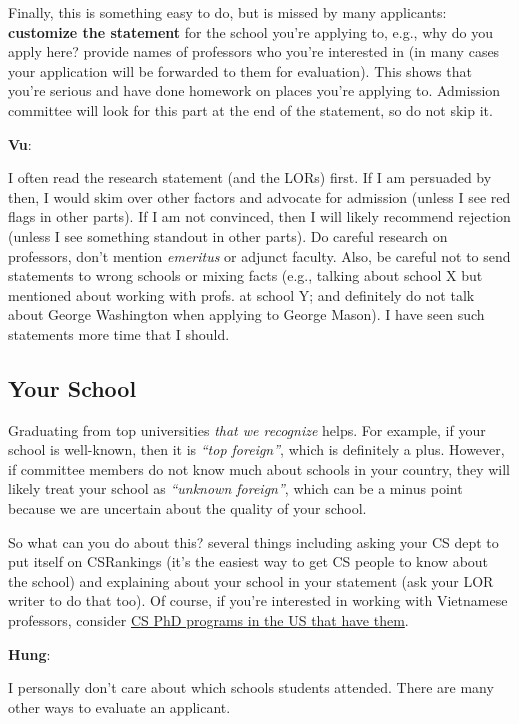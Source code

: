 \documentclass[11pt]{article}
\newenvironment{commentbox}[1][]{
\small
    \begin{cbox}
    \textbf{#1}: 
 }{
   \end{cbox}
}
\begin{document}
Finally, this is something easy to do, but is missed by many
applicants: \textbf{customize the statement} for the school you're applying to,
e.g., why do you apply here? provide names of professors who you're interested in (in many cases your application will be forwarded to them for evaluation).
This shows that you're serious and have done homework on places you're applying to.
Admission committee will look for this part at the end of the statement, so do not skip it.



\begin{commentbox}[Vu]
I often read the research statement (and the LORs) first. If I am
persuaded by then, I would skim over other factors and advocate for
admission (unless I see red flags in other parts). If I am not
convinced, then I will likely recommend rejection (unless I see
something standout in other parts).
\tcblower
Do careful research on professors, don't mention \emph{emeritus} or  adjunct faculty. 
Also, be careful not to send statements to wrong schools or mixing
facts (e.g., talking about school X but mentioned about working with
profs. at school Y; and definitely do not talk about George Washington when applying to George Mason). I have seen such statements more time that I
should.
\end{commentbox}


\subsection{Your School}\label{sec:your-school}

Graduating from top universities \emph{that we recognize} helps. For example, if your school is well-known, then it is \emph{``top foreign''}, which is definitely a plus.
However, if committee members do not know much about schools in your country, they will likely treat your school as
\emph{``unknown foreign''}, which can be a minus point because we are uncertain about the quality of your school.

So what can you do about this? several things including asking your CS dept to put itself on CSRankings (it's the easiest way to get CS people to know about the school) and explaining about your school in your statement (ask your LOR writer to do that too). Of course, if you're interested in working with Vietnamese professors, consider  \href{https://github.com/dynaroars/dynaroars.github.io/wiki/Viet-CS-Profs-US}{CS PhD programs in the US that have them}.

\begin{commentbox}[Hung]
I personally don’t care about which schools students attended. There are many other ways to evaluate an applicant.
\end{commentbox}
\end{document}
